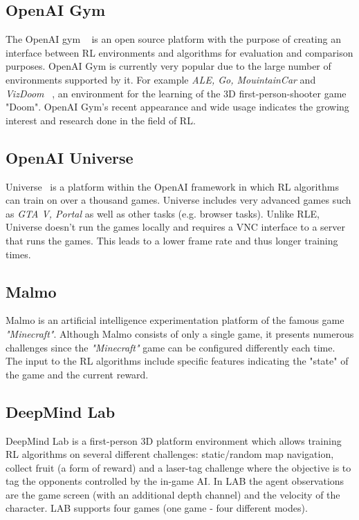 \documentclass{article}
\begin{document}
\subsection{OpenAI Gym}
The OpenAI gym ~\citep{brockman2016openai} is an open source platform with the purpose of creating an interface between RL environments and algorithms for evaluation and comparison purposes. OpenAI Gym is currently very popular due to the large number of environments supported by it. For example \textit{ALE, Go, MouintainCar} and \textit{VizDoom} ~\citep{zhu2016target}, an environment for the learning of the 3D first-person-shooter game "Doom". OpenAI Gym's recent appearance and wide usage indicates the growing interest and research done in the field of RL. 

\subsection{OpenAI Universe}
Universe~\citep{Universe} is a platform within the OpenAI framework in which RL algorithms can train on over a thousand games. Universe includes very advanced games such as \textit{GTA V, Portal} as well as other tasks (e.g. browser tasks). Unlike RLE, Universe doesn't run the games locally and requires a VNC interface to a server that runs the games. This leads to a lower frame rate and thus longer training times.

\subsection{Malmo}
Malmo \citep{johnson2016malmo} is an artificial intelligence experimentation platform of the famous game \textit{"Minecraft"}. Although Malmo consists of only a single game, it presents numerous challenges since the \textit{"Minecraft"} game can be configured differently each time. The input to the RL algorithms include specific features indicating the "state" of the game and the current reward.

\subsection{DeepMind Lab}
DeepMind Lab \citep{DeepMindLab} is a first-person 3D platform environment which allows training RL algorithms on several different challenges: static/random map navigation, collect fruit (a form of reward) and a laser-tag challenge where the objective is to tag the opponents controlled by the in-game AI. In LAB the agent observations are the game screen (with an additional depth channel) and the velocity of the character. LAB supports four games (one game - four different modes).
\end{document}
